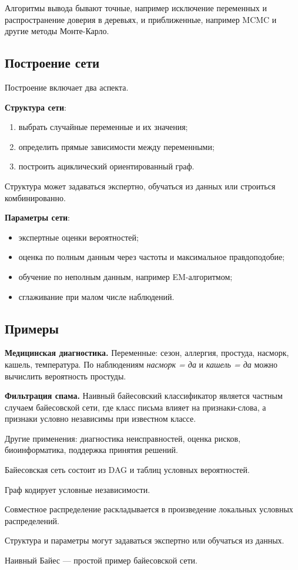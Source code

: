Алгоритмы вывода бывают точные, например исключение переменных и распространение доверия в деревьях, и приближенные, например MCMC и другие методы Монте-Карло.

\subsection*{Построение сети}

Построение включает два аспекта.

\textbf{Структура сети}:
\begin{enumerate}
    \item выбрать случайные переменные и их значения;
    \item определить прямые зависимости между переменными;
    \item построить ациклический ориентированный граф.
\end{enumerate}

Структура может задаваться экспертно, обучаться из данных или строиться комбинированно.

\textbf{Параметры сети}:
\begin{itemize}
    \item экспертные оценки вероятностей;
    \item оценка по полным данным через частоты и максимальное правдоподобие;
    \item обучение по неполным данным, например EM-алгоритмом;
    \item сглаживание при малом числе наблюдений.
\end{itemize}

\subsection*{Примеры}

\textbf{Медицинская диагностика.} Переменные: сезон, аллергия, простуда, насморк, кашель, температура. По наблюдениям \textit{насморк = да} и \textit{кашель = да} можно вычислить вероятность простуды.

\textbf{Фильтрация спама.} Наивный байесовский классификатор является частным случаем байесовской сети, где класс письма влияет на признаки-слова, а признаки условно независимы при известном классе.

Другие применения: диагностика неисправностей, оценка рисков, биоинформатика, поддержка принятия решений.

\begin{important}
    \item Байесовская сеть состоит из DAG и таблиц условных вероятностей.
    \item Граф кодирует условные независимости.
    \item Совместное распределение раскладывается в произведение локальных условных распределений.
    \item Структура и параметры могут задаваться экспертно или обучаться из данных.
    \item Наивный Байес --- простой пример байесовской сети.
\end{important}
